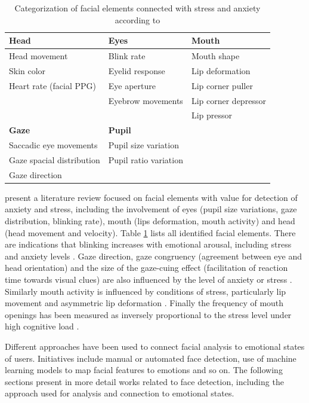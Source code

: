 \begin{table}[h!]
\caption{Categorization of facial elements connected with stress and anxiety according to \textcite{giannakakis2017stress}}
\label{table:stress-facial-features}
\begin{tabular}{lll}%
\toprule%
\textbf{Head} & \textbf{Eyes} & \textbf{Mouth} \\
\midrule
Head movement & Blink rate & Mouth shape \\
Skin color & Eyelid response & Lip deformation  \\
Heart rate (facial PPG) & Eye aperture & Lip corner puller \\
& Eyebrow movements & Lip corner depressor \\
& & Lip pressor \\
\midrule
\textbf{Gaze} & \textbf{Pupil} & \\
\midrule
Saccadic eye movements & Pupil size variation &  \\
Gaze spacial distribution & Pupil ratio variation &  \\
Gaze direction & &\\
\bottomrule%
\end{tabular}%
\end{table}

\textcite{giannakakis2017stress} present a literature review focused on facial elements with value for detection of anxiety and stress, including the involvement of eyes (pupil size variations, gaze distribution, blinking rate), mouth (lips deformation, mouth activity) and head (head movement and velocity). Table \ref{table:stress-facial-features} lists all identified facial elements. There are indications that blinking increases with emotional arousal, including stress and anxiety levels \parencite{dinges2005optical}. Gaze direction, gaze congruency (agreement between eye and head orientation) and the size of the gaze-cuing effect (facilitation of reaction time towards visual clues) are also influenced by the level of anxiety or stress \parencite{staab2014influence}. Similarly mouth activity is influenced by conditions of stress, particularly lip movement \parencite{dinges2005optical} and asymmetric lip deformation \parencite{metaxas2004image}. Finally the frequency of mouth openings has been measured as inversely proportional to the stress level under high cognitive load \parencite{liao2005decision}.

Different approaches have been used to connect facial analysis to emotional states of users. Initiatives include manual or automated face detection, use of machine learning models to map facial features to emotions and so on. The following sections present in more detail works related to face detection, including the approach used for analysis and connection to emotional states.

